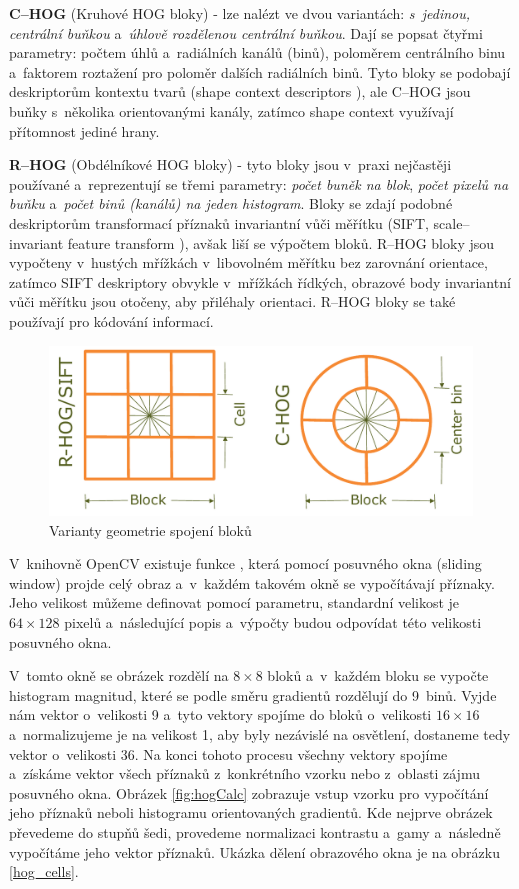 \textbf{C--HOG} (Kruhové HOG bloky) - lze nalézt ve dvou variantách: \textit{s~jedinou, centrální buňkou} a~\textit{úhlově rozdělenou centrální buňkou}. Dají se popsat čtyřmi parametry: počtem úhlů a~radiálních kanálů (binů), poloměrem centrálního binu a~faktorem roztažení pro poloměr dalších radiálních binů.  Tyto bloky se podobají deskriptorům kontextu tvarů (shape context descriptors \cite{shapeContext}), ale C--HOG jsou buňky s~několika orientovanými kanály, zatímco shape context využívají přítomnost jediné hrany.

\textbf{R--HOG} (Obdélníkové HOG bloky) - tyto bloky jsou v~praxi nejčastěji používané a~reprezentují se třemi parametry: \textit{počet buněk na blok}, \textit{počet pixelů na buňku} a~\textit{počet binů (kanálů) na jeden histogram}. Bloky se zdají podobné deskriptorům transformací příznaků invariantní vůči měřítku (SIFT, scale--invariant feature transform  \cite{siftPaper}), avšak liší se výpočtem bloků. R--HOG bloky jsou vypočteny v~hustých mřížkách v~libovolném měřítku bez zarovnání orientace, zatímco SIFT deskriptory obvykle v~mřížkách řídkých, obrazové body invariantní vůči měřítku jsou otočeny, aby přiléhaly orientaci. R--HOG bloky se také používají pro kódování informací. 
\begin{figure}[H]
  \centering
  \includegraphics[width=14cm]{figures/hog_variants.pdf}
  \caption{Varianty geometrie spojení bloků \cite{hog:dalal}}
  \label{variants_block}
\end{figure}
V~knihovně OpenCV existuje funkce , která pomocí posuvného okna (sliding window) projde celý obraz a~v~každém takovém okně se vypočítávají příznaky. Jeho velikost můžeme definovat pomocí parametru, standardní velikost je $64\times128$ pixelů a~následující popis a~výpočty budou odpovídat této velikosti posuvného okna.  

V~tomto okně se obrázek rozdělí na $8\times8$ bloků a~v~každém bloku se vypočte histogram magnitud, které se podle směru gradientů rozdělují do 9~binů. Vyjde nám vektor o~velikosti 9 a~tyto vektory spojíme do bloků o~velikosti $16\times16$ a~normalizujeme je na velikost 1, aby byly nezávislé na osvětlení, dostaneme tedy vektor o~velikosti 36. Na konci tohoto procesu všechny vektory spojíme a~získáme vektor všech příznaků z~konkrétního vzorku nebo z~oblasti zájmu posuvného okna. Obrázek \ref{fig:hogCalc} zobrazuje vstup vzorku pro vypočítání jeho příznaků neboli histogramu orientovaných gradientů. Kde nejprve obrázek převedeme do stupňů šedi, provedeme normalizaci kontrastu a~gamy a~následně vypočítáme jeho vektor příznaků.
Ukázka dělení obrazového okna je na obrázku \ref{hog_cells}.

